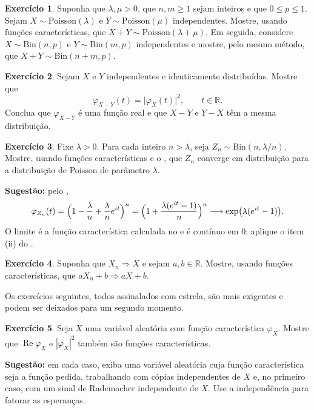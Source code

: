 \documentclass[12pt,portuguese]{article}
\theoremstyle{definition}
\theoremstyle{plainexercise}
\newtheorem{exercise}{Exercício}
\theoremstyle{starredexercise}
\newtheorem{starredexercise}[exercise]{Exercício}
\theoremstyle{definition}
\begin{document}
\begin{exercise}\label{exercise:aditividade-poisson-binomial}
Suponha que $\lambda,\mu>0$, que $n,m\geqslant1$ sejam inteiros e que
$0\leqslant p\leqslant1$. Sejam $X\sim\mathrm{Poisson}(\lambda)$ e
$Y\sim\mathrm{Poisson}(\mu)$ independentes. Mostre, usando funções
características, que $X+Y\sim\mathrm{Poisson}(\lambda+\mu)$. Em seguida,
considere $X\sim\mathrm{Bin}(n,p)$ e $Y\sim\mathrm{Bin}(m,p)$ independentes e
mostre, pelo mesmo método, que $X+Y\sim\mathrm{Bin}(n+m,p)$.
\end{exercise}

\begin{exercise}\label{exercise:gw-7-98}
Sejam $X$ e $Y$ independentes e identicamente distribuídas. Mostre que
\[
\varphi_{X-Y}(t)=\bigl|\varphi_X(t)\bigr|^{2}, \qquad t\in\mathbb{R}.
\]
Conclua que $\varphi_{X-Y}$ é uma função real e que $X-Y$ e $Y-X$ têm a mesma
distribuição.
\end{exercise}

\begin{exercise}\label{exercise:binomial-poisson-fc}
Fixe $\lambda>0$. Para cada inteiro $n>\lambda$, seja
$Z_n\sim\mathrm{Bin}(n,\lambda/n)$. Mostre, usando funções características e o
, que $Z_n$ converge em distribuição para a
distribuição de Poisson de parâmetro $\lambda$.

\noindent\textbf{Sugestão:} pelo ,
\[
\varphi_{Z_n}(t)
=\Bigl(1-\frac{\lambda}{n}+\frac{\lambda}{n}e^{it}\Bigr)^{n}
=\Bigl(1+\frac{\lambda(e^{it}-1)}{n}\Bigr)^{n}
\longrightarrow
\exp\bigl(\lambda(e^{it}-1)\bigr).
\]
O limite é a função característica calculada no  e é contínuo
em $0$; aplique o item (ii) do .
\end{exercise}

\begin{exercise}\label{exercise:gw-8-51}
Suponha que $X_n\Rightarrow X$ e sejam $a,b\in\mathbb{R}$. Mostre, usando
funções características, que $aX_n+b\Rightarrow aX+b$.
\end{exercise}

\medskip

Os exercícios seguintes, todos assinalados com estrela, são mais exigentes e
podem ser deixados para um segundo momento.

\begin{starredexercise}\label{exercise:parte-real-modulo}
Seja $X$ uma variável aleatória com função característica $\varphi_X$. Mostre que
$\operatorname{Re}\varphi_X$ e $|\varphi_X|^2$ também são funções características.

\noindent\textbf{Sugestão:} em cada caso, exiba uma variável aleatória cuja função
característica seja a função pedida, trabalhando com cópias independentes de $X$
e, no primeiro caso, com um sinal de Rademacher independente de $X$. Use a
independência para fatorar as esperanças.
\end{starredexercise}
\end{document}
